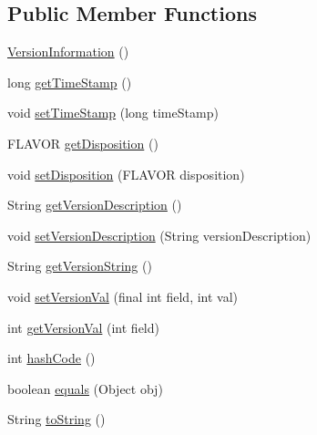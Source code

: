 \subsection*{Public Member Functions}
\begin{DoxyCompactItemize}
\item 
\hyperlink{classgov_1_1fnal_1_1ppd_1_1dd_1_1util_1_1version_1_1VersionInformation_af4471912cacd2bbb1ff3eecc148b824e}{Version\-Information} ()
\item 
long \hyperlink{classgov_1_1fnal_1_1ppd_1_1dd_1_1util_1_1version_1_1VersionInformation_ae9f86a54a3298654a55c8c1e771bce6a}{get\-Time\-Stamp} ()
\item 
void \hyperlink{classgov_1_1fnal_1_1ppd_1_1dd_1_1util_1_1version_1_1VersionInformation_a5564d38346f3a936840c82318e1cdc2e}{set\-Time\-Stamp} (long time\-Stamp)
\item 
F\-L\-A\-V\-O\-R \hyperlink{classgov_1_1fnal_1_1ppd_1_1dd_1_1util_1_1version_1_1VersionInformation_aec69aa2f69f6df902fb9da5e45b9a146}{get\-Disposition} ()
\item 
void \hyperlink{classgov_1_1fnal_1_1ppd_1_1dd_1_1util_1_1version_1_1VersionInformation_a1e3cec92f0dbdd71120e000e6787750e}{set\-Disposition} (F\-L\-A\-V\-O\-R disposition)
\item 
String \hyperlink{classgov_1_1fnal_1_1ppd_1_1dd_1_1util_1_1version_1_1VersionInformation_ac549f15230289e67d0aa6346265bd0f3}{get\-Version\-Description} ()
\item 
void \hyperlink{classgov_1_1fnal_1_1ppd_1_1dd_1_1util_1_1version_1_1VersionInformation_aa2815f5f73561ad56a803674fa70c87b}{set\-Version\-Description} (String version\-Description)
\item 
String \hyperlink{classgov_1_1fnal_1_1ppd_1_1dd_1_1util_1_1version_1_1VersionInformation_a2f986225367b6c4b22085cd2e193af86}{get\-Version\-String} ()
\item 
void \hyperlink{classgov_1_1fnal_1_1ppd_1_1dd_1_1util_1_1version_1_1VersionInformation_a6481bf957491a248df4420de2e0dbf94}{set\-Version\-Val} (final int field, int val)
\item 
int \hyperlink{classgov_1_1fnal_1_1ppd_1_1dd_1_1util_1_1version_1_1VersionInformation_adfcdb07f96bb338c4362c059a4876f0e}{get\-Version\-Val} (int field)
\item 
int \hyperlink{classgov_1_1fnal_1_1ppd_1_1dd_1_1util_1_1version_1_1VersionInformation_a8c0fa24131825cf91b4af5a31054668b}{hash\-Code} ()
\item 
boolean \hyperlink{classgov_1_1fnal_1_1ppd_1_1dd_1_1util_1_1version_1_1VersionInformation_a2e640db116e069eabbc9f16b98678ca4}{equals} (Object obj)
\item 
String \hyperlink{classgov_1_1fnal_1_1ppd_1_1dd_1_1util_1_1version_1_1VersionInformation_ae6b3fbd1f3fd907536651c2a7d8160f0}{to\-String} ()
\end{DoxyCompactItemize}

